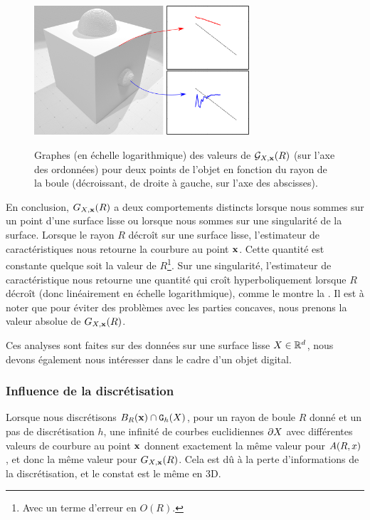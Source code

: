 \begin{figure}[ht]
\begin{center}
  {\includegraphics[width=8cm]{figures/CubeSpherePlot_ES_NoColor}}
  \caption{Graphes (en échelle logarithmique) des valeurs de $\mathcal{G}_{X,\mathbf{x}}(R)$ (sur
  l'axe des ordonnées) pour deux points de l'objet
  \CubeSphere en fonction du rayon de la boule (décroissant, de droite à gauche,
  sur l'axe des abscisses).\label{fig:CubeSpherePlot_ES_NoColor}}
\end{center}
\end{figure}

En conclusion, $G_{X,\mathbf{x}}(R)$ a deux comportements distincts lorsque nous sommes
sur un point d'une surface lisse ou lorsque nous sommes sur une singularité de
la surface. Lorsque le rayon $R$ décroît sur une surface lisse, l'estimateur de
caractéristiques nous retourne la courbure au point $\mathbf{x}$. Cette quantité est
constante quelque soit la valeur de $R$\footnote{Avec un terme d'erreur en $O(R)$.}. Sur une singularité, l'estimateur de caractéristique
nous retourne une quantité qui croît hyperboliquement lorsque $R$ décroît (donc
linéairement en échelle logarithmique), comme le montre la
. Il est à noter que pour éviter des
problèmes avec les parties concaves, nous prenons la valeur absolue de
$G_{X,\mathbf{x}}(R)$.


Ces analyses sont faites sur des données sur une surface lisse $X \in
\mathbb{R}^d$, nous devons également nous intéresser dans le cadre d'un objet digital.
%
\subsubsection{Influence de la discrétisation}%
\label{sec:applications:feature:II:kmax}
%
Lorsque nous discrétisons $B_{R}(\mathbf{x}) \cap \mathtt{G}_{h}(X)$, pour un rayon de boule $R$ donné et un pas
de discrétisation $h$, une infinité de courbes euclidiennes $\partial X$ avec
différentes valeurs de courbure au point $\mathbf{x}$ donnent exactement la même valeur
pour $A(R,x)$, et donc la même valeur pour $G_{X,\mathbf{x}}(R)$. Cela est dû à la perte
d'informations de la discrétisation, et le constat est le même en 3D.

